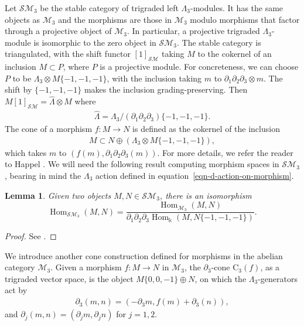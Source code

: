\documentclass[10pt,a4paper]{amsart}
\newtheorem{lem}[thm]{Lemma}
\theoremstyle{definition}
\numberwithin{equation}{section}
\newcommand{\Hom}{\operatorname{Hom}}
\def\dif{\partial}
\def\lra{{\longrightarrow}}
\def\mc{\mathcal}
\begin{document}
Let $\mc{SM}_3$ be the stable category of trigraded left $\Lambda_3$-modules.
It has the same objects as $\mc{M}_3$ and the morphisms are those in
$\mc{M}_3$ modulo morphisms that factor through a projective object of $\mc{M}_3$.
In particular, a projective trigraded $\Lambda_3$-module is isomorphic to the
zero object in $\mc{SM}_3$. The stable category is triangulated, with the shift
functor $[1]_{\mc{SM}}$ taking $M$ to the cokernel of an inclusion $M\subset P$, where
$P$ is a projective module. For concreteness, we can choose $P$ to be $\Lambda_3\otimes M
\{-1,-1,-1\}$, with the inclusion taking $m$ to $\partial_1\partial_2\partial_3 \otimes m$.
The shift by $\{-1,-1,-1\}$ makes the inclusion grading-preserving.
Then $M[1]_{\mc{SM}}= \widehat{\Lambda}\otimes M$ where
\begin{gather*}\widehat{\Lambda} = \Lambda_3/(\partial_1\partial_2\partial_3) \{-1,-1,-1\}.\end{gather*}
The cone of a morphism $f\colon M \lra N$ is defined as the cokernel of the inclusion
\begin{gather*} M \subset N \oplus (\Lambda_3 \otimes M\{-1,-1,-1\}),\end{gather*}
which takes $m$ to $(f(m), \partial_1\partial_2\partial_3 (m))$. For more details, we refer the reader to Happel \cite{Ha}. We will need the following result computing morphism spaces in $\mc{SM}_3$, bearing in mind the $\Lambda_3$ action defined in equation~\eqref{eqn-d-action-on-morphism}.

\begin{lem}\label{lem-morphism-in-stable-cat}
Given two objects $M,N\in \mc{SM}_3$, there is an isomorphism
\[
\Hom_{\mc{SM}_3}(M,N)=\dfrac{\Hom_{\mc{M}_3}(M,N)}{\dif_1\dif_2\dif_3 \Hom_{\Bbbk}(M,N\{-1,-1,-1\})}.
\]
\end{lem}
\begin{proof}
See \cite[Corollary 5.5]{Q}.
\end{proof}

We introduce another cone construction defined for morphisms in the abelian category $\mc{M}_3$.
Given a morphism $f\colon M\lra N$ in $\mc{M}_3$, the $\dif_3$-cone $\mathrm{C}_3(f)$, as a trigraded vector space, is the object $M\{0,0,-1\} \oplus N$, on which the $\Lambda_3$-generators act by
\begin{gather}\label{eqn-d3-action-on-d3-cone}
 \partial_3(m,n)=(-\partial_3 m , f(m)+\partial_3(n)),
\end{gather}
and $\partial_j(m,n)=(\partial_j m, \partial_j n)$ for $j=1,2$.
\end{document}
